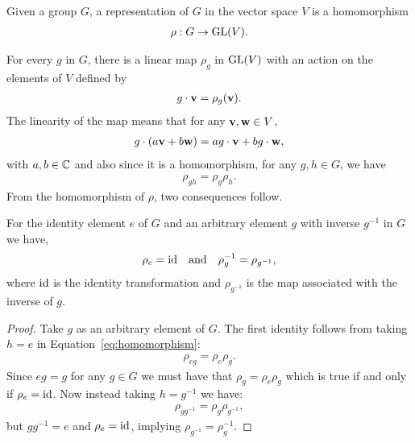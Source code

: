\begin{definition}[Representation]\cite{Serre}
	Given a group $G$, a representation of $G$ in the vector space $V$ is a homomorphism
	\begin{align}\label{eq:DefRepr}
		\rho: G \rightarrow \text{GL}(V).
	\end{align}
\end{definition}
For every $g$ in $G$, there is a linear map $\rho_g$ in $\text{GL}(V)$ with an action on the elements of $V$ defined by 
\begin{align*}
	g \cdot \mathbf{v} = \rho_g (\mathbf{v}).
\end{align*}
The linearity of the map means that for any $\mathbf{v}, \mathbf{w} \in V$,
\begin{align}\label{eq:linearityOfg}
	g \cdot (a\mathbf{v} + b\mathbf{w}) = ag\cdot\mathbf{v} + bg\cdot\mathbf{w},
\end{align} 
with $a,b \in \mathbb{C}$ and also since it is a homomorphism, for any $g,h \in G$, we have
\begin{align}\label{eq:homomorphism}
	\rho_{gh} = \rho_g \rho_h.
\end{align}
From the homomorphism of $\rho$, two consequences follow.
\begin{proposition}
	For the identity element $e$ of $G$ and an arbitrary element $g$ with inverse $g^{-1}$ in $G$ we have,
	\begin{align}\label{eq:rhoIdAndInv}
		\rho_e = \text{id} \quad \text{and} \quad \rho_g^{-1} = \rho_{g^{-1}},
	\end{align}
	where $\text{id}$ is the identity transformation and $\rho_{g^{-1}}$ is the map associated with the inverse of $g$.
\end{proposition}
\begin{proof}
	Take $g$ as an arbitrary element of $G$. The first identity follows from taking $h=e$ in Equation~\ref{eq:homomorphism}:
	\begin{align*}
		\rho_{eg} = \rho_e \rho_g.
	\end{align*}
	Since $eg=g$ for any $g\in G$ we must have that $\rho_g = \rho_e\rho_g$ which is true if and only if $\rho_e = \text{id}$. Now instead taking $h=g^{-1}$ we have:
	\begin{align*}
		\rho_{gg^{-1}} = \rho_g \rho_{g^{-1}},
	\end{align*}
	but $gg^{-1} = e$ and $\rho_e = \text{id}$, implying $\rho_{g^{-1}} = \rho_g^{-1}$.
\end{proof}

